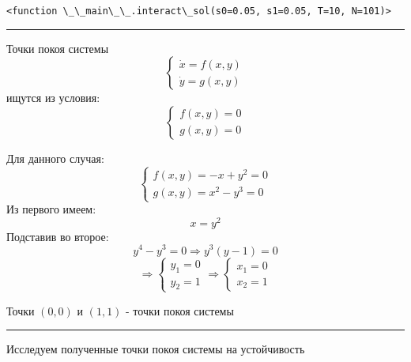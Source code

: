 \documentclass[11pt]{article}
\makeatletter
\newcommand{\boxspacing}{\kern\kvtcb@left@rule\kern\kvtcb@boxsep}
\newcommand{\prompt}[4]{
        {\ttfamily\llap{{\color{#2}[#3]:\hspace{3pt}#4}}\vspace{-\baselineskip}}
    }
\makeatother
\begin{document}
    
            \begin{tcolorbox}[breakable, size=fbox, boxrule=.5pt, pad at break*=1mm, opacityfill=0]
\prompt{Out}{outcolor}{4}{\boxspacing}
\begin{Verbatim}[commandchars=\\\{\}]
<function \_\_main\_\_.interact\_sol(s0=0.05, s1=0.05, T=10, N=101)>
\end{Verbatim}
\end{tcolorbox}
        
    \begin{center}\rule{0.5\linewidth}{0.5pt}\end{center}

Точки покоя системы \[
\begin{cases}
\dot{x}=f(x, y)\\
\dot{y}=g(x, y)
\end{cases}
\] ищутся из условия: \[
\begin{cases}
f(x, y)=0\\
g(x, y)=0
\end{cases}
\]

    Для данного случая: \[
\begin{cases}
f(x, y)=-x+y^2=0\\
g(x, y)=x^2-y^3=0
\end{cases}
\] Из первого имеем: \[
x=y^2
\] Подставив во второе: \[
y^4-y^3=0 \Rightarrow y^3(y-1)=0\] \[\Rightarrow
\begin{cases}
y_1=0\\
y_2=1
\end{cases}
\Rightarrow
\begin{cases}
x_1=0\\
x_2=1
\end{cases}
\]

Точки \((0, 0)\) и \((1, 1)\) - точки покоя системы

\begin{center}\rule{0.5\linewidth}{0.5pt}\end{center}

    Исследуем полученные точки покоя системы на устойчивость
\end{document}
